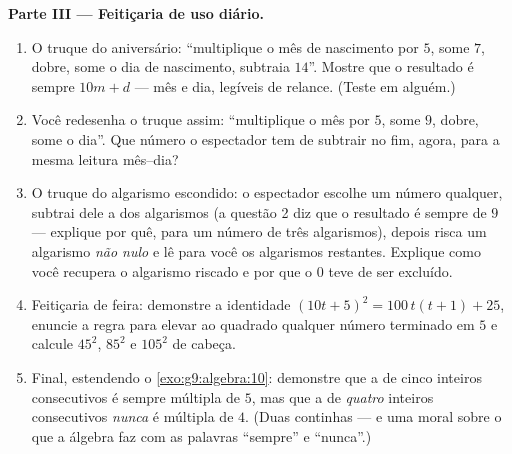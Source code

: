 \begin{problem}
\medskip
\noindent\textbf{Parte III --- Feitiçaria de uso diário.}
\begin{enumerate}[resume]
  \item O truque do aniversário: ``multiplique o mês de nascimento por
        $5$, some $7$, dobre, some o dia de nascimento, subtraia
        $14$''. Mostre que o resultado é sempre $10m + d$ --- mês e
        dia, legíveis de relance. (Teste em alguém.)
  \item Você redesenha o truque assim: ``multiplique o mês por $5$,
        some $9$, dobre, some o dia''. Que número o espectador tem de
        subtrair no fim, agora, para a mesma leitura mês--dia?
  \item O truque do algarismo escondido: o espectador escolhe um número
        qualquer, subtrai dele a  dos algarismos (a questão 2 diz
        que o resultado é sempre  de $9$ --- explique por quê,
        para um número de três algarismos), depois risca um algarismo
        \emph{não nulo} e lê para você os algarismos restantes.
        Explique como você recupera o algarismo riscado e por que o $0$
        teve de ser excluído.
  \item Feitiçaria de feira: demonstre a identidade
        $(10t + 5)^2 = 100\,t(t+1) + 25$, enuncie a regra para elevar
        ao quadrado qualquer número terminado em $5$ e calcule $45^2$,
        $85^2$ e $105^2$ de cabeça.
  \item Final, estendendo o \cref{exo:g9:algebra:10}: demonstre que a
         de cinco inteiros consecutivos é sempre múltipla de $5$,
        mas que a  de \emph{quatro} inteiros consecutivos
        \emph{nunca} é múltipla de $4$. (Duas continhas --- e uma moral
        sobre o que a álgebra faz com as palavras ``sempre'' e
        ``nunca''.)
\end{enumerate}
\end{problem}
